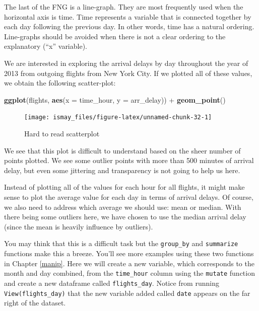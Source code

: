 \documentclass[]{tufte-book}
\newenvironment{Shaded}{\begin{snugshade}}{\end{snugshade}}
\newcommand{\KeywordTok}[1]{\textcolor[rgb]{0.13,0.29,0.53}{\textbf{{#1}}}}
\newcommand{\DataTypeTok}[1]{\textcolor[rgb]{0.13,0.29,0.53}{{#1}}}
\newcommand{\StringTok}[1]{\textcolor[rgb]{0.31,0.60,0.02}{{#1}}}
\newcommand{\NormalTok}[1]{{#1}}
\begin{document}
The last of the FNG is a line-graph. They are most frequently used when
the horizontal axis is time. Time represents a variable that is
connected together by each day following the previous day. In other
words, time has a natural ordering. Line-graphs should be avoided when
there is not a clear ordering to the explanatory (``x'' variable).

We are interested in exploring the arrival delays by day throughout the
year of 2013 from outgoing flights from New York City. If we plotted all
of these values, we obtain the following scatter-plot:

\begin{Shaded}
\begin{Highlighting}[]
\KeywordTok{ggplot}\NormalTok{(flights, }\KeywordTok{aes}\NormalTok{(}\DataTypeTok{x =} \NormalTok{time_hour, }\DataTypeTok{y =} \NormalTok{arr_delay)) +}\StringTok{ }
\StringTok{  }\KeywordTok{geom_point}\NormalTok{()}
\end{Highlighting}
\end{Shaded}

\begin{figure}

{\centering \texttt{[image: ismay\_files/figure-latex/unnamed-chunk-32-1]} 

}

\caption[Hard to read scatterplot]{Hard to read scatterplot}\label{fig:unnamed-chunk-32}
\end{figure}

We see that this plot is difficult to understand based on the sheer
number of points plotted. We see some outlier points with more than 500
minutes of arrival delay, but even some jittering and transparency is
not going to help us here.

Instead of plotting all of the values for each hour for all flights, it
might make sense to plot the average value for each day in terms of
arrival delays. Of course, we also need to address which average we
should use: mean or median. With there being some outliers here, we have
chosen to use the median arrival delay (since the mean is heavily
influence by outliers).

You may think that this is a difficult task but the \texttt{group\_by}
and \texttt{summarize} functions make this a breeze. You'll see more
examples using these two functions in Chapter \ref{manip}. Here we will
create a new variable, which corresponds to the month and day combined,
from the \texttt{time\_hour} column using the \texttt{mutate} function
and create a new dataframe called \texttt{flights\_day}. Notice from
running \texttt{View(flights\_day)} that the new variable added called
\texttt{date} appears on the far right of the dataset.
\end{document}
